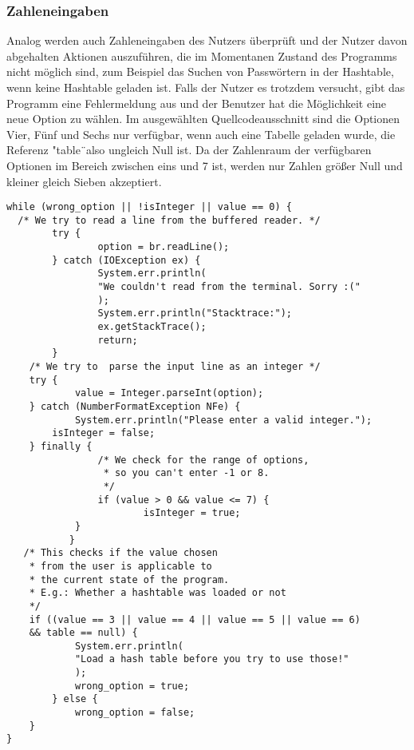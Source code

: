 \documentclass[11pt]{article}
\begin{document}
  \subsubsection{Zahleneingaben}
Analog werden auch Zahleneingaben des Nutzers überprüft und der Nutzer davon abgehalten Aktionen auszuführen, die im Momentanen Zustand des Programms nicht möglich sind, zum Beispiel das Suchen von Passwörtern in der Hashtable, wenn keine Hashtable geladen ist.
 Falls der Nutzer es trotzdem versucht, gibt das Programm eine Fehlermeldung aus und der Benutzer hat die Möglichkeit eine neue Option zu wählen.
Im ausgewählten Quellcodeausschnitt sind die Optionen Vier, Fünf und Sechs nur verfügbar, wenn auch eine Tabelle geladen wurde, die Referenz "table\"\ also ungleich Null ist. Da der Zahlenraum der verfügbaren Optionen im Bereich zwischen eins und 7 ist, werden nur Zahlen größer Null und kleiner gleich Sieben akzeptiert.\\
\begin{lstlisting}[caption=Überprüfung von Zahlen, label=lst:checkIntegers]
while (wrong_option || !isInteger || value == 0) {
  /* We try to read a line from the buffered reader. */
        try {
                option = br.readLine();
        } catch (IOException ex) {
                System.err.println(
                "We couldn't read from the terminal. Sorry :("
                );
                System.err.println("Stacktrace:");
                ex.getStackTrace();
                return;
        }
    /* We try to  parse the input line as an integer */
    try {
            value = Integer.parseInt(option);
    } catch (NumberFormatException NFe) {
            System.err.println("Please enter a valid integer.");
        isInteger = false;
    } finally {
                /* We check for the range of options, 
                 * so you can't enter -1 or 8. 
                 */
                if (value > 0 && value <= 7) {
                        isInteger = true;
            }
           }
   /* This checks if the value chosen 
    * from the user is applicable to 
    * the current state of the program.
    * E.g.: Whether a hashtable was loaded or not 
    */
    if ((value == 3 || value == 4 || value == 5 || value == 6) 
    && table == null) {
            System.err.println(
            "Load a hash table before you try to use those!"
            );
            wrong_option = true;
        } else {
            wrong_option = false;
    }
}
  \end{lstlisting}
\end{document}
